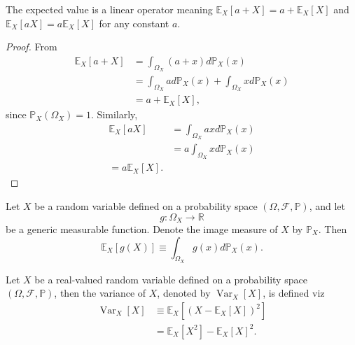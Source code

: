 \begin{theorem}
	\label{theorem:exp_linear}
	The expected value is a linear operator meaning $\mathbb{E}_X[a+X] = a+\mathbb{E}_X[X]$ and $\mathbb{E}_X[aX] = a\mathbb{E}_X[X]$ for any constant $a$.
\end{theorem}
\begin{proof}
	From  
	\begin{equation}
		\begin{split}
			\mathbb{E}_X[a + X] &= \int_{\Omega_X}(a + x) d\mathbb{P}_X(x) \\ 
			&= \int_{\Omega_X} a d\mathbb{P}_X(x) + \int_{\Omega_X} x d\mathbb{P}_X(x)\\
			&= a + \mathbb{E}_X[X],
		\end{split}
	\end{equation}
	since $\mathbb{P}_X(\Omega_X) = 1$. Similarly,
	\begin{equation}
		\begin{split}
			\mathbb{E}_X[a X] &= \int_{\Omega_X} a x d\mathbb{P}_X(x) \\
			& = a \int_{\Omega_X} x d\mathbb{P}_X(x)\\
			 = a \mathbb{E}_X[X].
		\end{split}
	\end{equation}
\end{proof}

\begin{remark}
	\label{th:lotus}
	Let $X$ be a random variable defined on a probability space $(\Omega, \mathcal{F}, \mathbb{P})$, and let 
	\begin{equation}
		g: \Omega_X \to \mathbb{R}
	\end{equation} 
	be a generic measurable function. Denote the image measure of $X$ by $\mathbb{P}_X $. Then
	\begin{equation}
		\mathbb{E}_X[g(X)] \equiv \int_{\Omega_X} g(x)d\mathbb{P}_X(x).
		\label{eq:lotus_image}
	\end{equation}
\end{remark}

\begin{definition}[Variance]
	\label{def:variance}
	Let $X$ be a real-valued random variable defined on a probability space $(\Omega, \mathcal{F},\mathbb{P})$, then the variance of $X$, denoted by $\operatorname{Var}_X[X]$, is defined viz
	\begin{equation}
		\begin{split}
			\operatorname{Var}_X[X]&\equiv \mathbb{E}_X[(X-\mathbb{E}_X[X])^2]\\
			&= \mathbb{E}_X[X^2]-\mathbb{E}_X[X]^2.
		\end{split}
	\end{equation}
\end{definition}

